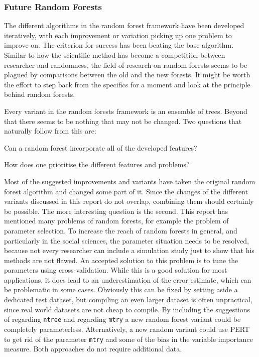 \documentclass[a4paper,man,12pt,apacite,floatsintext,draftfirst]{apa6} %
\begin{document}
\subsubsection{Future Random Forests}
The different algorithms in the random forest framework have been developed
iteratively, with each improvement or variation picking up one problem to
improve on.
The criterion for success has been beating the base algorithm.
Similar to how the scientific method has become a competition between
researcher and randomness, the field of research on random forests seems
to be plagued by comparisons between the old and the new forests.
It might be worth the effort to step back from the specifics for a moment
and look at the principle behind random forests.

Every variant in the random forests framework is an ensemble of trees.
Beyond that there seems to be nothing that may not be changed.
Two questions that naturally follow from this are:

\begin{APAenumerate}
\item Can a random forest incorporate all of the developed features?
\item How does one prioritise the different features and problems?
\end{APAenumerate}

Most of the suggested improvements and variants have taken the original
random forest algorithm and changed some part of it. Since the changes of
the different variants discussed in this report do not overlap, combining
them should certainly be possible.
The more interesting question is the second.
This report has mentioned many problems of random forests, for example the
problem of parameter selection.
To increase the reach of random forests in general, and particularly in
the social sciences, the parameter situation needs to be resolved, because
not every researcher can include a simulation study just to show that his
methods are not flawed.
An accepted solution to this problem is to tune the parameters using cross-validation.
While this is a good solution for most applications, it does lead to an
underestimation of the error estimate, which can be problematic in some cases.
Obviously this can be fixed by setting aside a dedicated test dataset, but
compiling an even larger dataset is often unpractical, since real world datasets
are not cheap to compile.
By including the suggestions of  regarding
\texttt{ntree} and  regarding \texttt{mtry}
a new random forest variant could be completely parameterless.
Alternatively, a new random variant could use PERT to get rid of the
parameter \texttt{mtry} and some of the bias in the variable importance
measure.
Both approaches do not require additional data.
\end{document}
